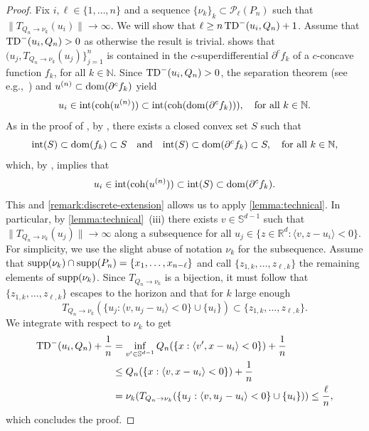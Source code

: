 \documentclass[11pt]{article}
\newcommand{\NN}{\mathbb{N}}
\theoremstyle{plain}
\theoremstyle{definition}\newtheorem{definition}[theorem]{Definition}
\theoremstyle{remark}
\begin{document}
\begin{proof}
Fix $ i, \ell\in \{1, \dots, n\}$ and a sequence $  \{\nu_{k}\}_k\subset \mathcal{P}_\ell( P_n) $ such that  $\|{ T}_{Q_n\to \nu_k}(u_i)\|\to \infty$. We will show that $\ell\geq n\,{\rm TD}^-(u_i, Q_n)+1 $. 
Assume that ${\rm TD}^-(u_i, Q_n)>0$ as otherwise the result is trivial. 
  shows that
$(u_j , { T}_{Q_n\to \nu_{k}}(u_j)\}_{j=1}^n $ is contained in the $c$-superdifferential $\partial^c f_{k}$ of a $c$-concave function $f_{k}$, for all $k\in \NN$. Since ${\rm TD}^-(u_i, Q_n)>0$, the separation theorem (see e.g.,~\cite[Theorem~11.2]{Rockafellar.70}) and $u^{(n)}\subset {\rm dom}(\partial^c f_k)$ yield 
%
$$ u_i \in {\rm int}({\rm coh}(u^{(n)})) \subset {\rm int}({\rm coh}({\rm dom}(\partial^c f_k) )), \quad \text{for all }k\in \NN.  $$
%
As in the proof of , by \cite[Theorem~3.3 and Proposition~C.4]{GangboMcCann.96}, there exists a closed convex set $S$ such that
$$ 
{\rm int}(S)\subset {\rm dom}(f_k) \subset S \quad {\rm and}\quad {\rm int}(S)\subset {\rm dom}(\partial^c f_k) \subset S, \quad \text{for all }k\in \NN, 
$$ 
which, by \cite[Theorem~6.3]{Rockafellar.70}, implies that 
$$ u_i \in {\rm int}({\rm coh}(u^{(n)})) \subset {\rm int}(S)\subset {\rm dom}(\partial^c f_k)  . $$
This and \cref{remark:discrete-extension} allows us to apply  \cref{lemma:technical}. 
In particular, by \cref{lemma:technical}~(iii) there exists $v\in \mathbb{S}^{d-1}$ such that $\|{ T}_{Q_n\to \nu_k}(u_j)\| \to \infty$ along a subsequence for all  $u_j\in \{z\in\mathbb{R}^d: \langle  v, z -u_i\rangle<0 \}$. For simplicity, we use the slight abuse of notation $\nu_k$ for the subsequence. 
Assume that  $ {\rm supp}(\nu_k) \cap {\rm supp}(P_n)=\{x_1, \dots, x_{n-\ell}\}$ and call $\{z_{1,k}, \dots, z_{\ell,k}\}$ the remaining elements of  ${\rm supp}(\nu_k)$.  Since ${ T}_{Q_n\to \nu_k}$ is a bijection, it must follow that $\{z_{1,k}, \dots, z_{\ell,k}\}$ escapes to the horizon and that for $k$ large enough
%
$$ { T}_{Q_n\to \nu_k} (\{u_j: \langle v, u_j -u_i\rangle<0\} \cup \{u_i\}) \subset \{z_{1,k}, \dots, z_{\ell,k}\}. $$
We integrate with respect to $\nu_k$ to get 
\begin{align*}
{\rm TD}^-(u_i, Q_n)+\frac{1}{n}&=  \inf_{v'\in \mathbb{S}^{d-1}} Q_n(\{ x: \langle v', x-u_i\rangle < 0\})+\frac{1}{n}\\
&\leq Q_n(\{ x: \langle v, x-u_i\rangle < 0\})+\frac{1}{n}\\
&=\nu_k( { T}_{Q_n\to \nu_k} (\{u_j: \langle v, u_j -u_i\rangle<0\} \cup \{u_i\}) ) \leq \frac{\ell}{n} ,  
\end{align*}
which concludes the proof.
\end{proof}
\end{document}
